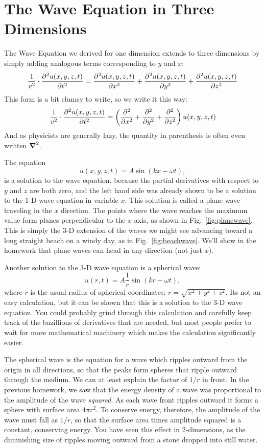 \documentclass[12pt]{article}
\begin{document}
\section{The Wave Equation in Three Dimensions}

The Wave Equation we derived for one dimension extends to three dimensions by simply adding analogous terms corresponding to $y$ and $x$:
\begin{equation}
\frac{1}{v^2} \cdot \frac{\partial^2 u(x,y,z,t)}{\partial t^2} = \frac{\partial^2 u(x,y,z,t)}{\partial x^2} + \frac{\partial^2 u(x,y,z,t)}{\partial y^2} + \frac{\partial^2 u(x,y,z,t)}{\partial z^2} 
\end{equation}  
This form is a bit clumsy to write, so we write it this way:
\begin{equation}\label{eqn:wave3d}
\frac{1}{v^2} \cdot \frac{\partial^2 u(x,y,z,t)}{\partial t^2} = \left( \frac{\partial^2 }{\partial x^2} + \frac{\partial^2 }{\partial y^2} + \frac{\partial^2 }{\partial z^2} \right) u(x,y,z,t) 
\end{equation}  
And as physicists are generally lazy, the quantity in parenthesis is often even written $\mbox{\boldmath$ \nabla $} ^2$.

The equation 
\begin{equation}
u(x,y,z,t) = A \sin(kx - \omega t),
\end{equation}  
is a solution to the wave equation, because the partial derivatives with respect to $y$ and $z$ are both zero, and the left hand side was already shown to be a solution to the 1-D wave equation in variable $x$.  This solution is called a plane wave traveling in the $x$ direction.  The points where the wave reaches the maximum value form planes perpendicular to the $x$ axis, as shown in Fig.~\ref{fig:planewave}.  This is simply the 3-D extension of the waves we might see advancing toward a long straight  beach on a windy day, as in Fig.~\ref{fig:beachwave}.  We'll show in the homework that plane waves can head in any direction (not just $x$).

Another solution to the 3-D wave equation is a spherical wave:
\begin{equation}
u(r,t) = A \frac{1}{r} \sin(kr - \omega t),
\end{equation}
where $r$ is the usual radius of spherical coordinates:  $r = \sqrt{x^2+y^2+z^2}$.  Its not an easy calculation, but it can be shown that this is a solution to the 3-D wave equation.   You could probably grind through this calculation and carefully keep track of the bazillions of derivatives that are needed, but most people prefer to wait for more mathematical machinery which makes the calculation significantly easier.

The spherical wave is the equation for a wave which ripples outward from the origin in all directions, so that the peaks form spheres that ripple outward through the medium.  We can at least explain the factor of $1/r$ in front.  In the previous homework, we saw that the energy density of a wave was proportional to the amplitude of the wave {\em squared}.  As each wave front ripples outward it forms a sphere with surface area $4 \pi r^2$.  To conserve energy, therefore, the amplitude of the wave must fall as $1/r$, so that the surface area times amplitude squared is a constant, conserving energy.  You have seen this effect in 2-dimensions, as the diminishing size of ripples moving outward from a stone dropped into still water.
\end{document}
